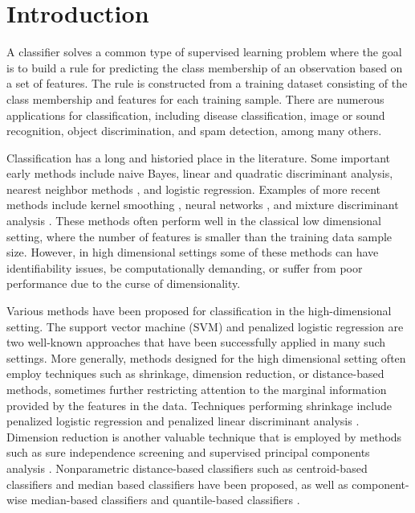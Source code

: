 
\section{Introduction}
\label{sec:intro}

A classifier solves a common type of supervised learning problem where the goal
is to build a rule for predicting the class membership of an observation based
on a set of features.  The rule is constructed from a training dataset
consisting of the class membership and features for each training sample.  There
are numerous applications for classification, including disease classification,
image or sound recognition, object discrimination, and spam detection, among
many others.

Classification has a long and historied place in the literature.  Some important
early methods include naive Bayes, linear and quadratic discriminant analysis,
nearest neighbor methods \cite{cover1967}, and logistic regression.  Examples of
more recent methods include kernel smoothing \cite{mika1999}, neural networks
\cite{ripley1994}, and mixture discriminant analysis \cite{hastie1996}.  These
methods often perform well in the classical low dimensional setting, where the
number of features is smaller than the training data sample size.  However, in
high dimensional settings some of these methods can have identifiability issues,
be computationally demanding, or suffer from poor performance due to the curse
of dimensionality.

Various methods have been proposed for classification in the high-dimensional
setting.  The support vector machine (SVM) \cite{cortes1995} and penalized
logistic regression \cite{park2007} are two well-known approaches that have been
successfully applied in many such settings.  More generally, methods designed
for the high dimensional setting often employ techniques such as shrinkage,
dimension reduction, or distance-based methods, sometimes further restricting
attention to the marginal information provided by the features in the data.
Techniques performing shrinkage include penalized logistic regression and
penalized linear discriminant analysis \cite{tibshirani2002, clemmensen2011,
  witten2011}.  Dimension reduction is another valuable technique that is
employed by methods such as sure independence screening \cite{fan2008} and
supervised principal components analysis \cite{bair2006}.  Nonparametric
distance-based classifiers such as centroid-based classifiers
\cite{tibshirani2002} and median based classifiers \cite{jornsten2004,
  ghosh2005} have been proposed, as well as component-wise median-based
classifiers \cite{hall2012} and quantile-based classifiers \cite{hennig2016}.

